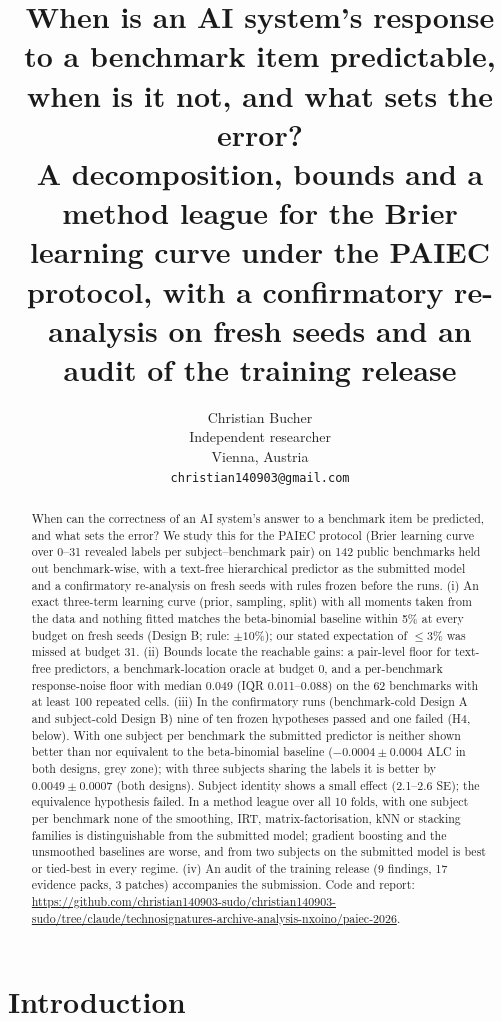 \documentclass{article}
\title{When is an AI system's response to a benchmark item predictable, when is it not, and what sets the error?\\
\large A decomposition, bounds and a method league for the Brier learning curve under the PAIEC protocol, with a
confirmatory re-analysis on fresh seeds and an audit of the training release}
\author{%
  Christian Bucher\\
  Independent researcher\\
  Vienna, Austria\\
  \texttt{christian140903@gmail.com}
}
\newcommand{\repourl}{{\small\urlstyle{same}\url{https://github.com/christian140903-sudo/christian140903-sudo/tree/claude/technosignatures-archive-analysis-nxoino/paiec-2026}}}
\begin{document}
\maketitle

\begin{abstract}
When can the correctness of an AI system's answer to a benchmark item be predicted, and what sets the error? We study
this for the PAIEC protocol (Brier learning curve over 0--31 revealed labels per subject--benchmark pair) on 142 public
benchmarks held out benchmark-wise, with a text-free hierarchical predictor as the submitted model and a confirmatory
re-analysis on fresh seeds with rules frozen before the runs. (i) An exact three-term learning
curve (prior, sampling, split) with all moments taken from the data and nothing fitted matches the beta-binomial
baseline within 5\% at every budget on fresh seeds (Design B; rule: $\pm 10\%$); our stated expectation of $\le 3\%$ was
missed at budget 31. (ii) Bounds locate the reachable gains: a pair-level floor for text-free predictors, a
benchmark-location oracle at budget 0, and a per-benchmark response-noise floor with median 0.049 (IQR 0.011--0.088) on
the 62 benchmarks with at least 100 repeated cells. (iii) In the confirmatory runs (benchmark-cold Design A and
subject-cold Design B) nine of ten frozen hypotheses passed and one failed (H4, below). With one subject per benchmark the submitted
predictor is neither shown better than nor equivalent to the beta-binomial baseline (\mbox{$-0.0004 \pm 0.0004$} ALC in both
designs, grey zone); with three subjects sharing the labels it is better by \mbox{$0.0049 \pm 0.0007$} (both designs). Subject
identity shows a small effect (2.1--2.6 SE); the equivalence hypothesis failed. In a method league over all 10 folds,
with one subject per benchmark none of the smoothing, IRT, matrix-factorisation, kNN or stacking families is
distinguishable from the submitted model; gradient boosting and the unsmoothed baselines are worse, and from two subjects
on the submitted model is best or tied-best in every regime. (iv) An audit of the training release (9 findings, 17 evidence packs, 3 patches) accompanies the submission.
Code and report: \repourl{}.
\end{abstract}

\section{Introduction}
\label{sec:intro}
\end{document}
